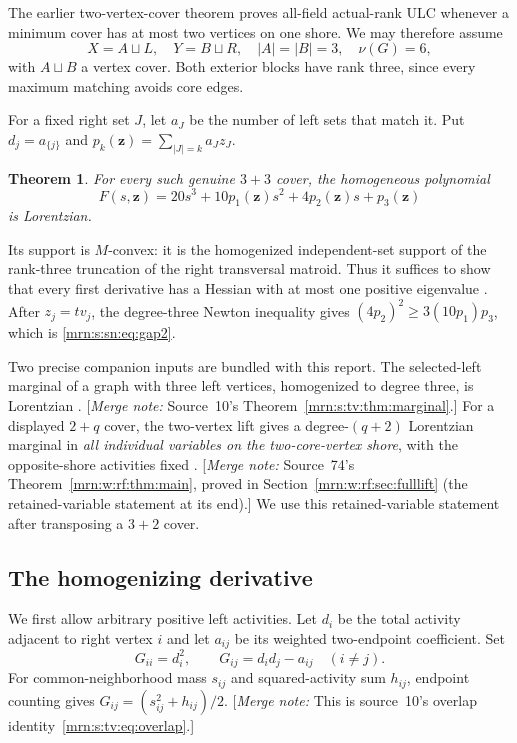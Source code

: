 \documentclass[11pt,a4paper]{article}
\newtheorem{theorem}{Theorem}[section]
\theoremstyle{remark}\newtheorem{remark}[theorem]{Remark}
\newcommand{\mnote}[1]{[\textit{Merge note:} #1]}
\begin{document}
The earlier two-vertex-cover theorem \cite{b:m74} proves all-field actual-rank
ULC whenever a minimum cover has at most two vertices on one shore. We may
therefore assume
\[
 X=A\sqcup L,\quad Y=B\sqcup R,\quad |A|=|B|=3,\quad \nu(G)=6,
\]
with $A\sqcup B$ a vertex cover. Both exterior blocks have rank three, since
every maximum matching avoids core edges.

For a fixed right set $J$, let $a_J$ be the number of left sets that match it.
Put $d_j=a_{\{j\}}$ and
$p_k(\mathbf z)=\sum_{|J|=k}a_Jz_J$.
\begin{theorem}\label{mrn:s:sn:thm:cubic}
For every such genuine $3+3$ cover, the homogeneous polynomial
\begin{equation}\label{mrn:s:sn:eq:F}
 F(s,\mathbf z)=20s^3+10p_1(\mathbf z)s^2+4p_2(\mathbf z)s+p_3(\mathbf z)
\end{equation}
is Lorentzian.
\end{theorem}
Its support is $M$-convex: it is the homogenized independent-set support of
the rank-three truncation of the right transversal matroid.
Thus it suffices to show that every first derivative has a Hessian with at
most one positive eigenvalue \cite[Theorem 2.25]{b:BH}.
After $z_j=t v_j$, the degree-three Newton inequality gives
$(4p_2)^2\ge3(10p_1)p_3$, which is \eqref{mrn:s:sn:eq:gap2}.

Two precise companion inputs are bundled with this report.
The selected-left marginal of a graph with three left vertices, homogenized
to degree three, is Lorentzian \cite{b:m10}. \mnote{Source~10's Theorem~\ref{mrn:s:tv:thm:marginal}.}
For a displayed $2+q$ cover, the two-vertex lift gives a degree-$(q+2)$
Lorentzian marginal in \emph{all individual variables on the two-core-vertex
shore}, with the opposite-shore activities fixed \cite[Section 3]{b:m74}. \mnote{Source~74's Theorem~\ref{mrn:w:rf:thm:main}, proved in Section~\ref{mrn:w:rf:sec:fulllift} (the retained-variable statement at its end).}
We use this retained-variable statement after transposing a $3+2$ cover.

\subsection{The homogenizing derivative}
We first allow arbitrary positive left activities. Let $d_i$ be the total
activity adjacent to right vertex $i$ and let $a_{ij}$ be its weighted
two-endpoint coefficient. Set
\[
 G_{ii}=d_i^2,\qquad G_{ij}=d_id_j-a_{ij}\quad(i\ne j).
\]
For common-neighborhood mass $s_{ij}$ and squared-activity sum $h_{ij}$,
endpoint counting gives $G_{ij}=(s_{ij}^2+h_{ij})/2$. \mnote{This is source~10's overlap identity~\eqref{mrn:s:tv:eq:overlap}.}
\end{document}
